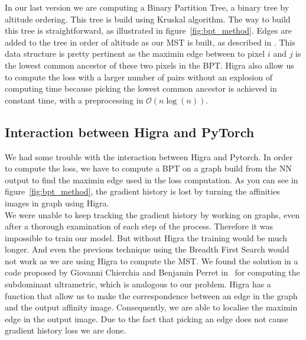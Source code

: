 In our last version we are computing a Binary Partition Tree, a binary tree by
altitude ordering. This tree is build using Kruskal algorithm. The way to build
this tree is straightforward, as illustrated in figure~\ref{fig:bpt_method}. 
Edges are added to the tree in order of altitude as our MST is built, as
described in \cite{najman_playing_2013}.
This data structure is pretty pertinent as the
maximin edge between to pixel $i$ and $j$ is the lowest common ancestor of these
two pixels in the BPT. Higra also allow us to compute the loss with a larger
number of pairs without an explosion of computing time because picking the
lowest common ancestor is achieved in constant time, with a preprocessing in
$\mathcal{O}(n\log(n))$.

\subsection{Interaction between Higra and PyTorch}

We had some trouble with the interaction between Higra and Pytorch. In order to
compute the loss, we have to compute a BPT on a graph build from the NN output
to find the maximin edge used in the loss computation. As you can see in
figure~\ref{fig:bpt_method}, the gradient history is lost by turning the
affinities images in graph using Higra.\\
We were unable to keep tracking the gradient history by working on
graphs, even after a thorough examination of each step of the process. 
Therefore it was impossible to train our model. But without Higra the
training would be much longer. And even the previous technique using the
Breadth First Search would not work as we are using Higra to compute the MST.
We found the solution in a code proposed by Giovanni Chierchia and Benjamin
Perret in~\cite{chierchia_ultrametric_2019} for computing the subdominant
ultrametric, which is analogous to our problem. Higra has a function that
allow us to make the correspondence between an edge in the graph and the output
affinity image. Consequently, we are able to localise the maximin edge in the
output image. Due to the fact that picking an edge does not cause gradient
history loss we are done.

